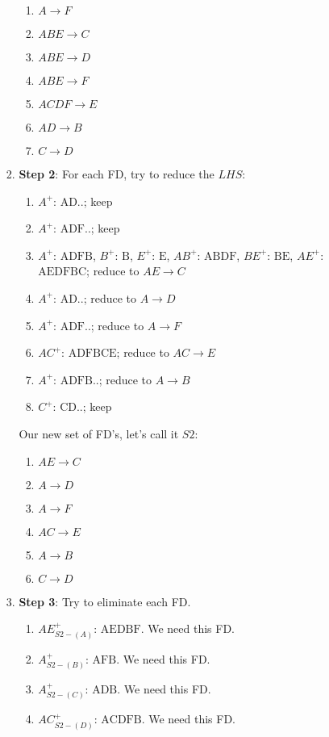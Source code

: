 \documentclass{csc_assignment2}
\begin{document}
\begin{description}
\begin{enumerate}
\begin{enumerate}
\begin{enumerate}
\begin{enumerate}
\item $A \rightarrow F$
\item $ABE \rightarrow C$
\item $ABE \rightarrow D$
\item $ABE \rightarrow F$
\item $ACDF \rightarrow E$
\item $AD \rightarrow B$
\item $C \rightarrow D$
\end{enumerate}
\item \textbf{Step 2}: For each FD, try to reduce the $LHS$: \begin{enumerate}
\item $A^{+}$: $\text{AD..}$; keep
\item $A^{+}$: $\text{ADF..}$; keep
\item $A^{+}$: $\text{ADFB}$, $B^{+}$: $\text{B}$, $E^{+}$: $\text{E}$, $AB^{+}$: $\text{ABDF}$, $BE^{+}$: $\text{BE}$, $AE^{+}$: $\text{AEDFBC}$; reduce to $AE \rightarrow C$
\item $A^{+}$: $\text{AD..}$; reduce to $A \rightarrow D$
\item $A^{+}$: $\text{ADF..}$; reduce to $A \rightarrow F$
\item $AC^{+}$: $\text{ADFBCE}$; reduce to $AC \rightarrow E$
\item $A^{+}$: $\text{ADFB..}$; reduce to $A \rightarrow B$
\item $C^{+}$: $\text{CD..}$; keep
\end{enumerate}
Our new set of FD's, let's call it $S2$: \begin{enumerate}
\item $AE \rightarrow C$
\item $A \rightarrow D$
\item $A \rightarrow F$
\item $AC \rightarrow E$
\item $A \rightarrow B$
\item $C \rightarrow D$
\end{enumerate}
\item \textbf{Step 3}: Try to eliminate each FD. \begin{enumerate}
\item $AE^{+}_{S2 - (A)}$: $\text{AEDBF}$. We need this FD.
\item $A^{+}_{S2 - (B)}$: $\text{AFB}$. We need this FD.
\item $A^{+}_{S2 - (C)}$: $\text{ADB}$. We need this FD.
\item $AC^{+}_{S2 - (D)}$: $\text{ACDFB}$. We need this FD.

\end{enumerate}
\end{enumerate}
\end{enumerate}
\end{enumerate}
\end{description}
\end{document}
